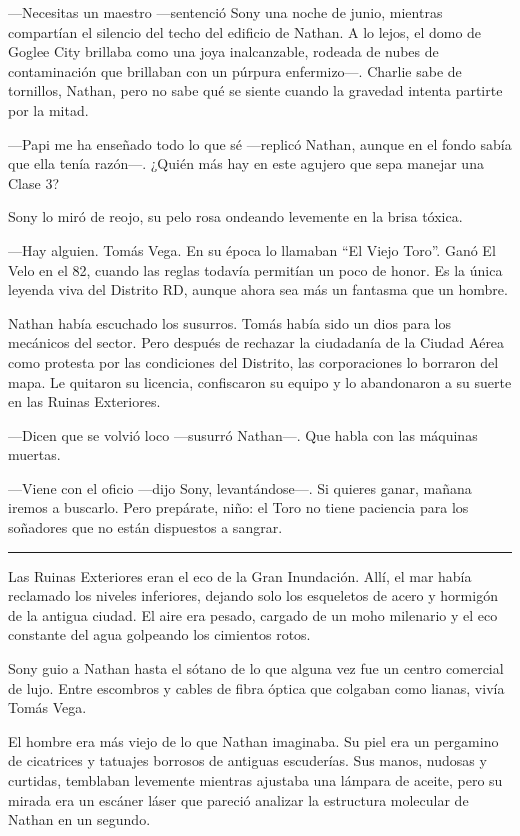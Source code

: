 \documentclass[12pt,a4paper]{book}
\begin{document}
---Necesitas un maestro ---sentenció Sony una noche de junio, mientras compartían el silencio del techo del edificio de Nathan. A lo lejos, el domo de Goglee City brillaba como una joya inalcanzable, rodeada de nubes de contaminación que brillaban con un púrpura enfermizo---. Charlie sabe de tornillos, Nathan, pero no sabe qué se siente cuando la gravedad intenta partirte por la mitad.

---Papi me ha enseñado todo lo que sé ---replicó Nathan, aunque en el fondo sabía que ella tenía razón---. ¿Quién más hay en este agujero que sepa manejar una Clase 3?

Sony lo miró de reojo, su pelo rosa ondeando levemente en la brisa tóxica.

---Hay alguien. Tomás Vega. En su época lo llamaban ``El Viejo Toro''. Ganó El Velo en el 82, cuando las reglas todavía permitían un poco de honor. Es la única leyenda viva del Distrito RD, aunque ahora sea más un fantasma que un hombre.

Nathan había escuchado los susurros. Tomás había sido un dios para los mecánicos del sector. Pero después de rechazar la ciudadanía de la Ciudad Aérea como protesta por las condiciones del Distrito, las corporaciones lo borraron del mapa. Le quitaron su licencia, confiscaron su equipo y lo abandonaron a su suerte en las Ruinas Exteriores.

---Dicen que se volvió loco ---susurró Nathan---. Que habla con las máquinas muertas.

---Viene con el oficio ---dijo Sony, levantándose---. Si quieres ganar, mañana iremos a buscarlo. Pero prepárate, niño: el Toro no tiene paciencia para los soñadores que no están dispuestos a sangrar.

\bigskip
\noindent\rule{\textwidth}{0.4pt}
\bigskip

Las Ruinas Exteriores eran el eco de la Gran Inundación. Allí, el mar había reclamado los niveles inferiores, dejando solo los esqueletos de acero y hormigón de la antigua ciudad. El aire era pesado, cargado de un moho milenario y el eco constante del agua golpeando los cimientos rotos.

Sony guio a Nathan hasta el sótano de lo que alguna vez fue un centro comercial de lujo. Entre escombros y cables de fibra óptica que colgaban como lianas, vivía Tomás Vega.

El hombre era más viejo de lo que Nathan imaginaba. Su piel era un pergamino de cicatrices y tatuajes borrosos de antiguas escuderías. Sus manos, nudosas y curtidas, temblaban levemente mientras ajustaba una lámpara de aceite, pero su mirada era un escáner láser que pareció analizar la estructura molecular de Nathan en un segundo.
\end{document}
